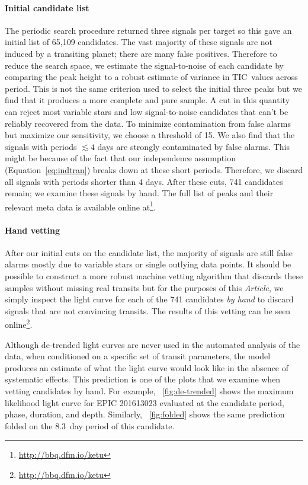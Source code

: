 \documentclass[12pt,preprint]{aastex}
\newcommand{\paper}{\textsl{Article}}
\newcommand{\figref}[1]{\ref{fig:#1}}
\newcommand{\Fig}[1]{\figurename~\figref{#1}}
\newcommand{\fig}[1]{\Fig{#1}}
\newcommand{\eqalt}[1]{Equation~\ref{eq:#1}}
\newcommand{\TIC}{{\ensuremath{\mathrm{TIC}}}}
\newcommand{\datareleaseurl}{{\url{http://bbq.dfm.io/ketu}}}
\begin{document}
\paragraph{Initial candidate list}

The periodic search procedure returned three signals per target so this gave
an initial list of 65,109 candidates.
The vast majority of these signals are not induced by a transiting planet;
there are many false positives.
Therefore to reduce the search space, we estimate the signal-to-noise of each
candidate by comparing the peak height to a robust estimate of variance in
\TIC\ values across period.
This is not the same criterion used to select the initial three peaks but we
find that it produces a more complete and pure sample.
A cut in this quantity can reject most variable stars and low signal-to-noise
candidates that can't be reliably recovered from the data.
To minimize contamination from false alarms but maximize our sensitivity, we
choose a threshold of 15.
We also find that the signals with periods $\lesssim 4$ days are strongly
contaminated by false alarms.
This might be because of the fact that our independence assumption
(\eqalt{indtran}) breaks down at these short periods.
Therefore, we discard all signals with periods shorter than 4 days.
After these cuts, 741 candidates remain; we examine these signals by hand.
The full list of peaks and their relevant meta data is available online
at\footnote{\datareleaseurl}.


\paragraph{Hand vetting}

After our initial cuts on the candidate list, the majority of signals are
still false alarms mostly due to variable stars or single outlying data
points.
It should be possible to construct a more robust machine vetting algorithm
that discards these samples without missing real transits but for the purposes
of this \paper, we simply inspect the light curve for each of the 741
candidates \emph{by hand} to discard signals that are not convincing transits.
The results of this vetting can be seen online\footnote{\datareleaseurl}.

Although de-trended light curves are never used in the automated analysis of
the data, when conditioned on a specific set of transit parameters, the model
produces an estimate of what the light curve would look like in the absence
of systematic effects.
This prediction is one of the plots that we examine when vetting candidates
by hand.
For example, \fig{de-trended} shows the maximum likelihood light curve for
EPIC 201613023 evaluated at the candidate period, phase, duration, and depth.
Similarly, \fig{folded} shows the same prediction folded on the 8.3~day
period of this candidate.
\end{document}
